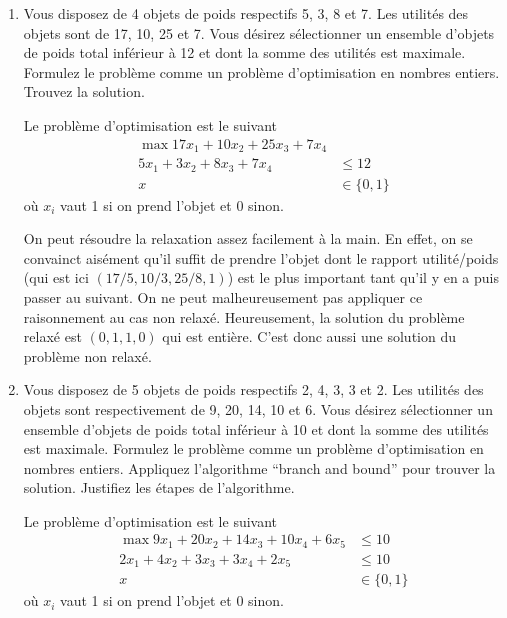 \begin{enumerate}
  \item Vous disposez de 4 objets de poids respectifs 5, 3, 8 et 7. Les utilités des
    objets sont de 17, 10, 25 et 7. Vous désirez sélectionner un ensemble d'objets de poids total inférieur  à 12 et dont la somme
    des utilités est maximale.  Formulez le problème comme un problème d'optimisation en nombres entiers. Trouvez la solution.


    \begin{solution}
      Le problème d'optimisation est le suivant
      \begin{align*}
        \max 17x_1 + 10x_2 + 25x_3 + 7x_4\\
        5x_1 + 3x_2 + 8x_3 + 7x_4 & \leq 12\\
        x & \in \{0,1\}
      \end{align*}
      où $x_i$ vaut 1 si on prend l'objet et 0 sinon.

      On peut résoudre la relaxation assez facilement à la main.
      En effet, on se convainct aisément qu'il
      suffit de prendre l'objet dont le rapport utilité/poids
      (qui est ici $(17/5,10/3,25/8,1)$)
      est le plus important tant qu'il y en a puis passer au suivant.
      On ne peut malheureusement pas appliquer ce raisonnement au cas
      non relaxé.
      Heureusement, la solution du problème relaxé est $(0,1,1,0)$ qui
      est entière.
      C'est donc aussi une solution du problème non relaxé.
    \end{solution}

  \item Vous disposez de 5 objets de poids respectifs 2, 4, 3, 3 et 2. Les
    utilités des objets sont respectivement de 9, 20, 14, 10 et 6. Vous désirez
    sélectionner un ensemble d'objets de poids total inférieur  à 10
    et dont la somme des utilités est maximale.  Formulez le problème
    comme un problème d'optimisation en nombres entiers. Appliquez l'algorithme ``branch and bound'' pour trouver la
    solution. Justifiez les étapes de l'algorithme.

    \begin{solution}
      Le problème d'optimisation est le suivant
      \begin{align*}
        \max 9x_1 + 20x_2 + 14x_3 + 10x_4 + 6x_5 & \leq 10\\
        2x_1 + 4x_2 + 3x_3 + 3x_4 + 2x_5 & \leq 10\\
        x & \in \{0,1\}
      \end{align*}
      où $x_i$ vaut 1 si on prend l'objet et 0 sinon.


\end{solution}
\end{enumerate}

